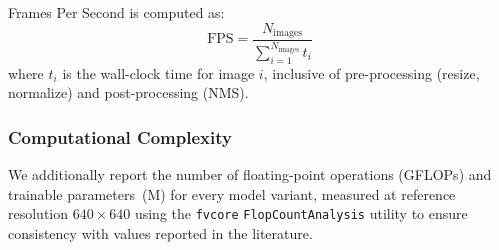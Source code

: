 Frames Per Second is computed as:
\begin{equation}
    \text{FPS} = \frac{N_{\text{images}}}
    {\sum_{i=1}^{N_{\text{images}}} t_{i}}
    \label{eq:fps}
\end{equation}
where $t_{i}$ is the wall-clock time for image $i$, inclusive
of pre-processing (resize, normalize) and post-processing (NMS).

\subsubsection{Computational Complexity}

We additionally report the number of floating-point operations
(GFLOPs) and trainable parameters~(M) for every model variant,
measured at reference resolution $640 \times 640$ using the
\texttt{fvcore} \texttt{FlopCountAnalysis} utility to ensure
consistency with values reported in the literature.
